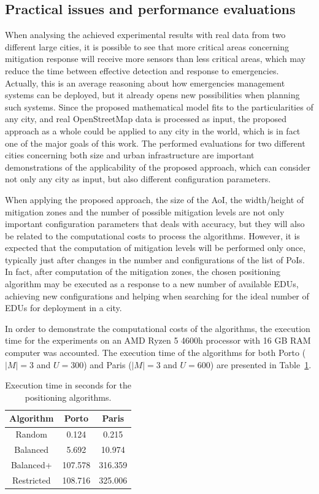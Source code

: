 \begin{refsection}
\subsection{Practical issues and performance evaluations}

When analysing the achieved experimental results with real data from two different large cities, it is possible to see that more critical areas concerning mitigation response will receive more sensors than less critical areas, which may reduce the time between effective detection and response to emergencies. Actually, this is an average reasoning about how emergencies management systems can be deployed, but it already opens new possibilities when planning such systems. Since the proposed mathematical model fits to the particularities of any city, and real OpenStreetMap data is processed as input, the proposed approach as a whole could be applied to any city in the world, which is in fact one of the major goals of this work. The performed evaluations for two different cities concerning both size and urban infrastructure are important demonstrations of the applicability of the proposed approach, which can consider not only any city as input, but also different configuration parameters.

When applying the proposed approach, the size of the AoI, the width/height of mitigation zones and the number of possible mitigation levels are not only important configuration parameters that deals with accuracy, but they will also be related to the computational costs to process the algorithms. However, it is expected that the computation of mitigation levels will be performed only once, typically just after changes in the number and configurations of the list of PoIs. In fact, after computation of the mitigation zones, the chosen positioning algorithm may be executed as a response to a new number of available EDUs, achieving new configurations and helping when searching for the ideal number of EDUs for deployment in a city. 

In order to demonstrate the computational costs of the algorithms, the execution time for the experiments on an AMD Ryzen 5 4600h processor with 16 GB RAM computer was accounted. The execution time of the algorithms for both Porto ($|M|=3$ and $U=300$) and Paris ($|M|=3$ and $U=600$) are presented in Table~\ref{Table:costs}.

\begin{table}
  \centering
  \caption{Execution time in seconds for the positioning algorithms.}\label{Table:costs}
  \begin{tabular}{c|c|c}
    \textbf{Algorithm} & \textbf{Porto} & \textbf{Paris} \\
    \hline
    Random  &  0.124 &  0.215 \\ 
    \hline
    Balanced  & 5.692  &  10.974 \\ 
    \hline
    Balanced+  & 107.578 &  316.359  \\ 
    \hline
    Restricted  & 108.716  & 325.006 \\ 
  \end{tabular}
\end{table}


\end{refsection}
